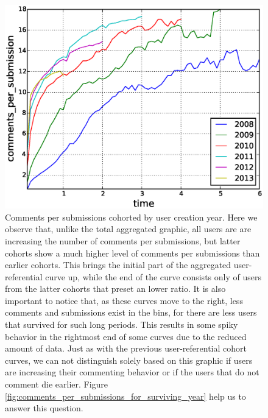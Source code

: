 \begin{figure}[!tb]
\centering
\includegraphics[scale=0.4]{./images/comments_per_submissions_cohorts.eps}
\caption{Comments per submissions cohorted by user creation year. Here we observe that, unlike the total aggregated graphic, all users are are increasing the number of comments per submissions, but latter cohorts show a much higher level of comments per submissions than earlier cohorts. This brings the initial part of the aggregated user-referential curve up, while the end of the curve consists only of users from the latter cohorts that preset an lower ratio. It is also important to notice that, as these curves move to the right, less comments and submissions exist in the bins, for there are less users that survived for such long periods. This results in some spiky behavior in the rightmost end of some curves due to the reduced amount of data. Just as with the previous user-referential cohort curves, we can not distinguish solely based on this graphic if users are increasing their commenting behavior or if the users that do not comment die earlier. Figure \ref{fig:comments_per_submissions_for_surviving_year} help us to answer this question.}
\label{fig:comments_per_submissions_cohorts}
\end{figure}


